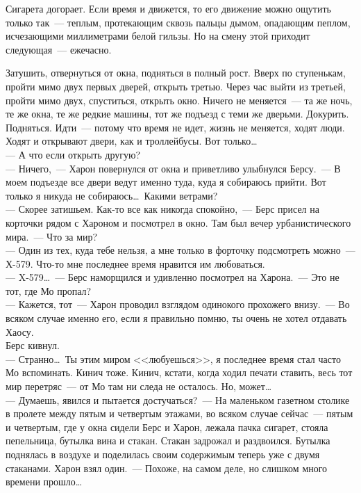 Сигарета догорает. Если время и движется, то его движение можно ощутить только 
так~--- теплым, протекающим сквозь пальцы дымом, опадающим пеплом, исчезающими 
миллиметрами белой гильзы. Но на смену этой приходит следующая~--- ежечасно.

Затушить, отвернуться от окна, подняться в полный рост. Вверх по ступенькам, 
пройти мимо двух первых дверей, открыть третью. Через час выйти из третьей, 
пройти мимо двух, спуститься, открыть окно. Ничего не меняется~--- та же ночь, 
те же окна, те же редкие машины, тот же подъезд с теми же дверьми. Докурить. 
Подняться. Идти~--- потому что время не идет, жизнь не меняется, ходят люди. 
Ходят и открывают двери, как и троллейбусы. Вот только\ldots\\
--- А что если открыть другую?\\
--- Ничего,~--- Харон повернулся от окна и приветливо улыбнулся Берсу.~--- В моем 
подъезде все двери ведут именно туда, куда я собираюсь прийти. Вот только я 
никуда не собираюсь\ldots\ Какими ветрами?\\
--- Скорее затишьем. Как-то все как никогда спокойно,~--- Берс присел на корточки 
рядом с Хароном и посмотрел в окно. Там был вечер урбанистического мира.~--- 
Что за мир?\\
--- Один из тех, куда тебе нельзя, а мне только в форточку подсмотреть можно~--- 
Х-579. Что-то мне последнее время нравится им любоваться.\\
--- X-579\ldots~--- Берс наморщился и удивленно посмотрел на Харона.~--- Это не 
тот, где Мо пропал?\\
--- Кажется, тот~--- Харон проводил взглядом одинокого прохожего внизу.~--- Во 
всяком случае именно его, если я правильно помню, ты очень не хотел отдавать Хаосу.\\
Берс кивнул.\\
--- Странно\ldots\ Ты этим миром <<любуешься>>, я последнее время стал часто Мо 
вспоминать. Кинич тоже. Кинич, кстати, когда ходил печати ставить, весь тот мир 
перетряс~--- от Мо там ни следа не осталось. Но, может\ldots\\
--- Думаешь, явился и пытается достучаться?~--- На маленьком газетном столике в 
пролете между пятым и четвертым этажами, во всяком случае сейчас~--- пятым и 
четвертым, где у окна сидели Берс и Харон, лежала пачка сигарет, стояла 
пепельница, бутылка вина и стакан. Стакан задрожал и раздвоился. Бутылка 
поднялась в воздухе и поделилась своим содержимым теперь уже с двумя стаканами. 
Харон взял один.~--- Похоже, на самом деле, но слишком много времени 
прошло\ldots


